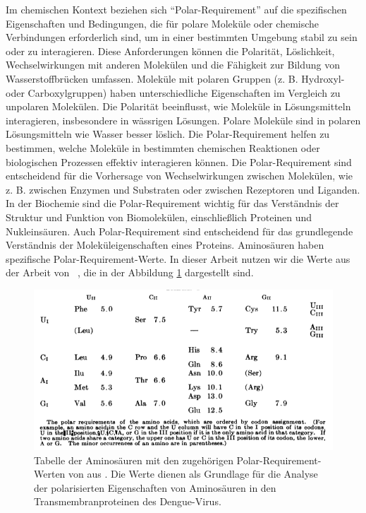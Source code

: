 \documentclass[german,version-2022-01]{uzl-thesis}
\begin{document}
Im chemischen Kontext beziehen sich "`Polar-Requirement"' auf die spezifischen Eigenschaften und Bedingungen, die f\"ur polare Molek\"ule oder chemische Verbindungen erforderlich sind, um in einer bestimmten Umgebung stabil zu sein oder zu interagieren. Diese Anforderungen k\"onnen die Polarit\"at, L\"oslichkeit, Wechselwirkungen mit anderen Molek\"ulen und die F\"ahigkeit zur Bildung von Wasserstoffbr\"ucken umfassen. Molek\"ule mit polaren Gruppen (z. B. Hydroxyl- oder Carboxylgruppen) haben unterschiedliche Eigenschaften im Vergleich zu unpolaren Molek\"ulen. Die Polarit\"at beeinflusst, wie Molek\"ule in L\"osungsmitteln interagieren, insbesondere in w\"assrigen L\"osungen. Polare Molek\"ule sind in polaren L\"osungsmitteln wie Wasser besser l\"oslich. Die Polar-Requirement helfen zu bestimmen, welche Molek\"ule in bestimmten chemischen Reaktionen oder biologischen Prozessen effektiv interagieren k\"onnen. Die Polar-Requirement sind entscheidend f\"ur die Vorhersage von Wechselwirkungen zwischen Molek\"ulen, wie z. B. zwischen Enzymen und Substraten oder zwischen Rezeptoren und Liganden. In der Biochemie sind die Polar-Requirement wichtig f\"ur das Verst\"andnis der Struktur und Funktion von Biomolek\"ulen, einschlie\ss{}lich Proteinen und Nukleins\"auren. Auch Polar-Requirement sind entscheidend f\"ur das grundlegende Verst\"andnis der Molek\"uleigenschaften eines Proteins. 
Aminos\"auren haben spezifische Polar-Requirement-Werte. In dieser Arbeit nutzen wir die Werte aus der Arbeit  von \citeauthor{woese_fundamental_1966}~\cite{woese_fundamental_1966}, die in der Abbildung \ref{fig:Polar_requirements_indexe} dargestellt sind. 
\begin{figure}[tbp]
  \centering
  \includegraphics[scale=0.6]{Images/polar_requirements_scores_Paper.png}
  \caption{Tabelle der Aminos\"auren mit den zugeh\"origen Polar-Requirement-Werten von \citeauthor{woese_fundamental_1966} aus \citeyear{woese_fundamental_1966}  \cite{woese_fundamental_1966}. Die Werte dienen als Grundlage f\"ur die Analyse der polarisierten Eigenschaften von Aminos\"auren in den Transmembranproteinen des Dengue-Virus.}
  \label{fig:Polar_requirements_indexe}
\end{figure}
\end{document}
